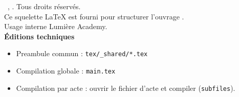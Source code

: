 \documentclass[../main.tex]{subfiles}
\begin{document}
\thispagestyle{empty}
\small
\noindent \textcopyright\ \BookAuthor, \BookDate. Tous droits réservés.\\[0.6em]
Ce squelette LaTeX est fourni pour structurer l'ouvrage \emph{\BookTitle}.\\
Usage interne Lumière Academy.\\[2em]

\noindent \textbf{Éditions techniques}\\
\begin{itemize}
  \item Preambule commun : \texttt{tex/\_shared/*.tex}
  \item Compilation globale : \texttt{main.tex}
  \item Compilation par acte : ouvrir le fichier d'acte et compiler (\texttt{subfiles}).
\end{itemize}
\clearpage
\end{document}
